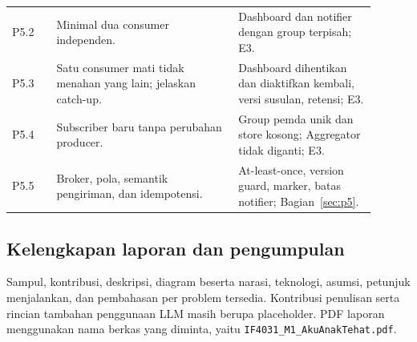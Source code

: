 \begin{longtable}{P{0.11\linewidth}P{0.45\linewidth}P{0.34\linewidth}}
P5.2 & Minimal dua consumer independen. & Dashboard dan notifier dengan group terpisah; E3.\\
P5.3 & Satu consumer mati tidak menahan yang lain; jelaskan catch-up. & Dashboard dihentikan dan diaktifkan kembali, versi susulan, retensi; E3.\\
P5.4 & Subscriber baru tanpa perubahan producer. & Group pemda unik dan store kosong; Aggregator tidak diganti; E3.\\
P5.5 & Broker, pola, semantik pengiriman, dan idempotensi. & At-least-once, version guard, marker, batas notifier; Bagian~\ref{sec:p5}.\\
\bottomrule
\end{longtable}
\normalsize

\subsection*{Kelengkapan laporan dan pengumpulan}
Sampul, kontribusi, deskripsi, diagram beserta narasi, teknologi, asumsi, petunjuk menjalankan, dan pembahasan per problem tersedia. Kontribusi penulisan serta rincian tambahan penggunaan LLM masih berupa placeholder. PDF laporan menggunakan nama berkas yang diminta, yaitu \nolinkurl{IF4031_M1_AkuAnakTehat.pdf}.

